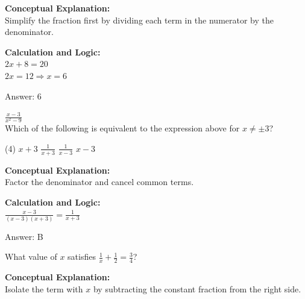 \documentclass[11pt,paper=a4,answers]{exam}
\begin{document}
\begin{questions}
\begin{solution}
\textbf{Conceptual Explanation:} \\
Simplify the fraction first by dividing each term in the numerator by the denominator.

\vspace{20pt}

\textbf{Calculation and Logic:} \\
$2x + 8 = 20$ \\
$2x = 12 \Rightarrow x = 6$

\vspace{25pt}

Answer: \colorbox{yellow!100}{6}
\end{solution}

\vspace{40pt}

\question
$\frac{x-3}{x^2-9}$ \\
Which of the following is equivalent to the expression above for $x \neq \pm 3$?
\begin{tasks}(4)
    \task $x+3$
    \task $\frac{1}{x+3}$
    \task $\frac{1}{x-3}$
    \task $x-3$
\end{tasks}

\begin{solution}
\textbf{Conceptual Explanation:} \\
Factor the denominator and cancel common terms.

\vspace{20pt}

\textbf{Calculation and Logic:} \\
$\frac{x-3}{(x-3)(x+3)} = \frac{1}{x+3}$

\vspace{25pt}

Answer: \colorbox{yellow!100}{B}
\end{solution}

\vspace{40pt}

\question
What value of $x$ satisfies $\frac{1}{x} + \frac{1}{2} = \frac{3}{4}$?

\begin{solution}
\textbf{Conceptual Explanation:} \\
Isolate the term with $x$ by subtracting the constant fraction from the right side.


\end{solution}
\end{questions}
\end{document}
